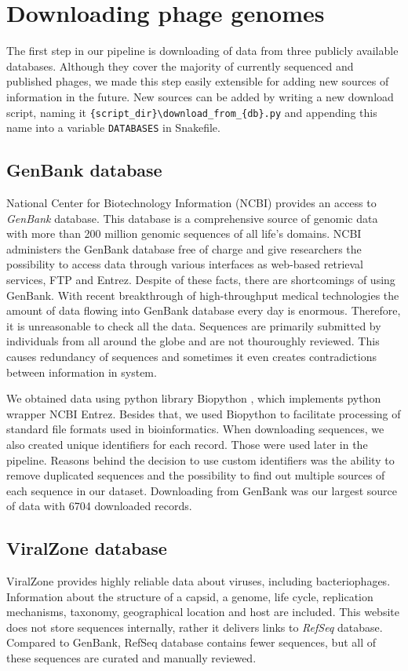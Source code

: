 \section{Downloading phage genomes}
The first step in our pipeline is downloading of data from three publicly available databases.
Although they cover the majority of currently sequenced and published phages, we made this step easily extensible for adding new sources of information in the future.
New sources can be added by writing a new download script, naming it \verb|{script_dir}\download_from_{db}.py| and appending this name into a variable \verb|DATABASES| in Snakefile.

\subsection{GenBank database}
National Center for Biotechnology Information (NCBI) provides an access to \emph{GenBank}\cite{genbank} database.
This database is a comprehensive source of genomic data with more than 200 million genomic sequences of all life’s domains.
NCBI administers the GenBank database free of charge and give researchers the possibility to access data through various interfaces as web-based retrieval services, FTP and Entrez\cite{entrez}.
Despite of these facts, there are shortcomings of using GenBank.
With recent breakthrough of high-throughput medical technologies the amount of data flowing into GenBank database every day is enormous.
Therefore, it is unreasonable to check all the data.
Sequences are primarily submitted by individuals from all around the globe and are not thouroughly reviewed.
This causes redundancy of sequences and sometimes it even creates contradictions between information in system.

We obtained data using python library Biopython \cite{biopython}, which implements python wrapper NCBI Entrez.
Besides that, we used Biopython to facilitate  processing of standard file formats used in bioinformatics.
When downloading sequences, we also created unique identifiers for each record.
Those were used later in the pipeline.
Reasons behind the decision to use custom identifiers was the ability to remove duplicated sequences and the possibility to find out multiple sources of each sequence in our dataset.
Downloading from GenBank was our largest source of data with 6704 downloaded records.

\subsection{ViralZone database}
ViralZone provides highly reliable data about viruses, including bacteriophages.
Information about the structure of a capsid, a genome, life cycle, replication mechanisms, taxonomy, geographical location and host are included.
This website does not store sequences internally, rather it delivers links to \emph{RefSeq}\cite{refseq} database.
Compared to GenBank, RefSeq database contains fewer sequences, but all of these sequences are curated and manually reviewed.

